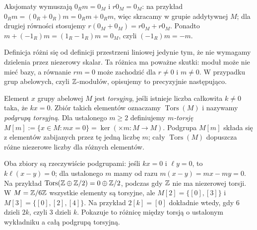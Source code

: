 Aksjomaty wymuszają $0_Rm=0_M$ i $r0_M=0_M$:
na przykład $0_Rm=(0_R+0_R)m=0_Rm+0_Rm$,
więc skracamy w grupie addytywnej $M$; dla drugiej
równości stosujemy $r(0_M+0_M)=r0_M+r0_M$.
Ponadto $m+(-1_R)m=(1_R-1_R)m=0_M$,
czyli $(-1_R)m=-m$.

Definicja różni się od definicji przestrzeni liniowej
jedynie tym, że nie wymagamy dzielenia przez
niezerowy skalar. Ta różnica ma poważne skutki:
moduł może nie mieć bazy, a równanie $rm=0$ może
zachodzić dla $r\ne0$ i $m\ne0$.
W przypadku grup abelowych, czyli $\mathbb{Z}$-modułów,
opisujemy to precyzyjnie następująco.

\begin{definicja}
\label{def:torsja}
Element $x$ grupy abelowej $M$ jest
\emph{torsyjny}, jeśli istnieje liczba całkowita
$k\ne0$ taka, że $kx=0$. Zbiór takich elementów
oznaczamy $\operatorname{Tors}(M)$ i nazywamy
\emph{podgrupą torsyjną}. Dla ustalonego $m\geq2$
definiujemy \emph{$m$-torsję}
$M[m]:=\{x\in M:mx=0\}=\ker(\times m:M\to M)$.
Podgrupa $M[m]$ składa się z elementów zabijanych
przez tę jedną liczbę $m$; cały
$\operatorname{Tors}(M)$ dopuszcza różne niezerowe
liczby dla różnych elementów.
\end{definicja}

Oba zbiory są rzeczywiście podgrupami: jeśli
$kx=0$ i $\ell y=0$, to $k\ell(x-y)=0$;
dla ustalonego $m$ mamy od razu
$m(x-y)=mx-my=0$. Na przykład
$\operatorname{Tors}(\mathbb{Z}\oplus\mathbb{Z}/2)
=0\oplus\mathbb{Z}/2$, podczas gdy $\mathbb{Z}$
nie ma niezerowej torsji.
W $M=\mathbb{Z}/6\mathbb{Z}$ wszystkie elementy są torsyjne,
ale $M[2]=\{[0],[3]\}$ i
$M[3]=\{[0],[2],[4]\}$. Na przykład
$2[k]=[0]$ dokładnie wtedy, gdy $6$ dzieli $2k$,
czyli $3$ dzieli $k$. Pokazuje to różnicę między
torsją o ustalonym wykładniku a całą podgrupą torsyjną.

